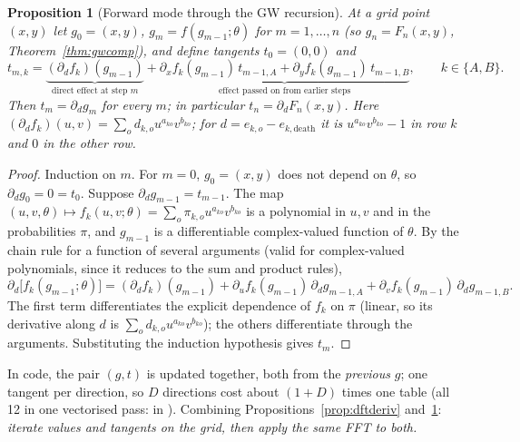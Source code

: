 \documentclass[11pt]{article}
\newtheorem{proposition}[theorem]{Proposition}
\theoremstyle{definition}
\theoremstyle{remark}
\newcommand{\code}[1]{\texttt{\detokenize{#1}}}
\begin{document}
\begin{proposition}[Forward mode through the GW recursion]\label{prop:forward}
At a grid point $(x,y)$ let $g_0=(x,y)$, $g_m=f(g_{m-1};\theta)$ for $m=1,\dots,n$ (so $g_n=F_n(x,y)$, Theorem~\ref{thm:gwcomp}), and define tangents $t_0=(0,0)$ and
\[
t_{m,k}=\underbrace{(\partial_df_k)(g_{m-1})}_{\text{direct effect at step }m}+\underbrace{\partial_xf_k(g_{m-1})\,t_{m-1,A}+\partial_yf_k(g_{m-1})\,t_{m-1,B}}_{\text{effect passed on from earlier steps}},\qquad k\in\{A,B\}.
\]
Then $t_m=\partial_dg_m$ for every $m$; in particular $t_n=\partial_dF_n(x,y)$. Here $(\partial_df_k)(u,v)=\sum_od_{k,o}u^{a_{ko}}v^{b_{ko}}$; for $d=e_{k,o}-e_{k,\mathrm{death}}$ it is $u^{a_{ko}}v^{b_{ko}}-1$ in row $k$ and $0$ in the other row.
\end{proposition}
\begin{proof}
Induction on $m$. For $m=0$, $g_0=(x,y)$ does not depend on $\theta$, so $\partial_dg_0=0=t_0$. Suppose $\partial_dg_{m-1}=t_{m-1}$. The map $(u,v,\theta)\mapsto f_k(u,v;\theta)=\sum_o\pi_{k,o}u^{a_{ko}}v^{b_{ko}}$ is a polynomial in $u,v$ and in the probabilities $\pi$, and $g_{m-1}$ is a differentiable complex-valued function of $\theta$. By the chain rule for a function of several arguments (valid for complex-valued polynomials, since it reduces to the sum and product rules),
\[
\partial_d\big[f_k(g_{m-1};\theta)\big]=(\partial_df_k)(g_{m-1})+\partial_uf_k(g_{m-1})\,\partial_dg_{m-1,A}+\partial_vf_k(g_{m-1})\,\partial_dg_{m-1,B}.
\]
The first term differentiates the explicit dependence of $f_k$ on $\pi$ (linear, so its derivative along $d$ is $\sum_od_{k,o}u^{a_{ko}}v^{b_{ko}}$); the others differentiate through the arguments. Substituting the induction hypothesis gives $t_m$.
\end{proof}
\noindent In code, the pair $(g,t)$ is updated together, both from the \emph{previous} $g$; one tangent per direction, so $D$ directions cost about $(1+D)$ times one table (all 12 in one vectorised pass: \code{law_and_jac} in \code{profile.py}). Combining Propositions~\ref{prop:dftderiv} and~\ref{prop:forward}: \emph{iterate values and tangents on the grid, then apply the same FFT to both.}
\end{document}
